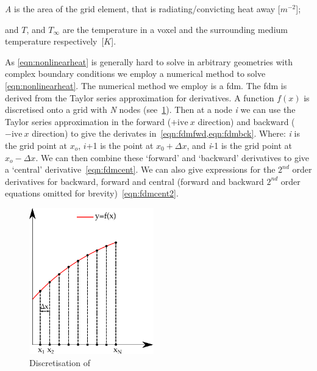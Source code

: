 	\indent \textit{A} is the area of the grid element, that is radiating/convicting heat away [$m^{-2}$];
	
	\indent and $T$, and $T_\infty$ are the temperature in a voxel and the surrounding medium temperature respectively~[$K$].
	
	\medskip

As \cref{eqn:nonlinearheat} is generally hard to solve in arbitrary geometries with complex boundary conditions we employ a numerical method to solve \cref{eqn:nonlinearheat}.
The numerical method we employ is a \gls{fdm}. The \gls{fdm} is derived from the Taylor series approximation for derivatives. A function $f(x)$ is discretised onto a grid with \textit{N} nodes (see~\cref{fig:fdmexplain}). Then at a node \textit{i} we can use the Taylor series approximation in the forward ($+\text{ive}\ x$ direction) and backward ($-\text{ive}\ x$ direction) to give the derivates in~\cref{eqn:fdmfwd,eqn:fdmbck}. Where: \textit{i} is the grid point at $x_o$, $i$+1 is the point at $x_0+\Delta x$, and \textit{i}-1 is the grid point at $x_{o}-\Delta x$. We can then combine these `forward' and `backward' derivatives to give a `central' derivative~\cref{eqn:fdmcent}. We can also give expressions for the $2^{nd}$ order derivatives for backward, forward and central (forward and backward $2^{nd}$ order equations omitted for brevity)~\cref{eqn:fdmcent2}.

\begin{figure}
  \begin{center}
    \includegraphics[width=0.48\textwidth]{./ablation/images/fdm.pdf}
  \end{center}
  \caption{Discretisation of }\label{fig:fdmexplain}

\end{figure}

